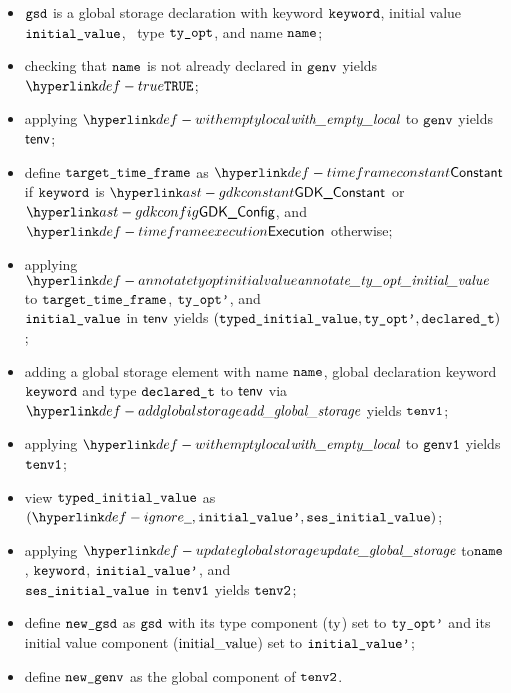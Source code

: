 \ProseParagraph
\AllApply
\begin{itemize}
  \item $\texttt{gsd}$ is a global storage declaration with keyword $\texttt{keyword}$, initial value \\ $\texttt{initial\_value}$,
        \optional\ type $\texttt{ty\_opt}$, and name $\texttt{name}$;
  \item checking that $\texttt{name}$ is not already declared in $\texttt{genv}$ yields $\True$\ProseOrTypeError;
  \item applying $\withemptylocal$ to $\texttt{genv}$ yields $\textsf{tenv}$;
  \item define $\texttt{target\_time\_frame}$ as $\timeframeconstant$ if $\texttt{keyword}$ is $\GDKConstant$ or $\GDKConfig$, and $\timeframeexecution$ otherwise;
  \item applying $\annotatetyoptinitialvalue$ to $\texttt{target\_time\_frame}$, $\texttt{ty\_opt'}$, and \\
        $\texttt{initial\_value}$ in $\textsf{tenv}$ yields
        $(\texttt{typed\_initial\_value}, \texttt{ty\_opt'}, \texttt{declared\_t})$\ProseOrTypeError;
  \item adding a global storage element with name $\texttt{name}$, global declaration keyword \\ $\texttt{keyword}$ and type $\texttt{declared\_t}$
        to $\textsf{tenv}$ via $\addglobalstorage$ yields $\texttt{tenv1}$\ProseOrTypeError;
  \item applying $\withemptylocal$ to $\texttt{genv1}$ yields $\texttt{tenv1}$;
  \item view $\texttt{typed\_initial\_value}$ as $(\Ignore, \initialvaluep, \vsesinitialvalue)$;
  \item applying $\updateglobalstorage$ to$\texttt{name}$, $\texttt{keyword}$, $\texttt{initial\_value'}$, and \\
        $\texttt{ses\_initial\_value}$ in $\texttt{tenv1}$ yields $\texttt{tenv2}$\ProseOrTypeError;
  \item define $\texttt{new\_gsd}$ as $\texttt{gsd}$ with its type component ($\text{ty}$) set to $\texttt{ty\_opt'}$ and its initial value component
        ($\text{initial\_value}$) set to $\texttt{initial\_value'}$;
  \item define $\texttt{new\_genv}$ as the global component of $\texttt{tenv2}$.
\end{itemize}
\FormallyParagraph
